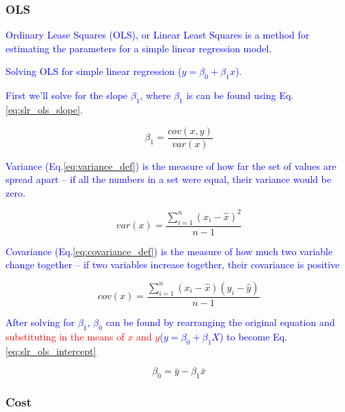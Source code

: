 \subsubsection{OLS}

\textcolor{blue}{{Ordinary Lease Squares (OLS)}, or {Linear Least Squares} is a method for estimating the parameters for a simple linear regression model.}

\textcolor{blue}{Solving OLS for simple linear regression ($y=\beta_0 + \beta_1 x$).}

\textcolor{blue}{First we'll solve for the slope $\beta_1$, where $\beta_1$ is can be found using Eq.\ref{eq:slr_ols_slope}.}

\begin{equation}
{\beta_1 =  \frac{cov(x,y)}{var(x)}}
\label{eq:slr_ols_slope}
\end{equation}


\textcolor{blue}{Variance (Eq.\ref{eq:variance_def}) is the measure of how far the set of values are spread apart -- if all the numbers in a set were equal, their variance would be zero.}

\begin{equation}
{var(x) = \frac{\sum_{i=1}^{n}(x_i - \hat{x})^2}{n-1}}
\label{eq:variance_def}
\end{equation}


\textcolor{blue}{Covariance (Eq.\ref{eq:covariance_def}) is the measure of how much two variable change together -- if two variables increase together, their covariance is positive}

\begin{equation}
{cov(x) = \frac{\sum_{i=1}^{n}(x_i - \hat{x})(y_i - \hat{y})}{n-1}}
\label{eq:covariance_def}
\end{equation}

\textcolor{blue}{After solving for $\beta_1$, $\beta_0$ can be found by rearranging the original equation and \textcolor{red}{substituting in the means of $x$ and $y$}($y=\beta_0 + \beta_1 X$) to become Eq.\ref{eq:slr_ols_intercept}}

\begin{equation}
{\beta_0 =  \bar{y} - \beta_1 \bar{x}}
\label{eq:slr_ols_intercept}
\end{equation}

\subsubsection{Cost}


